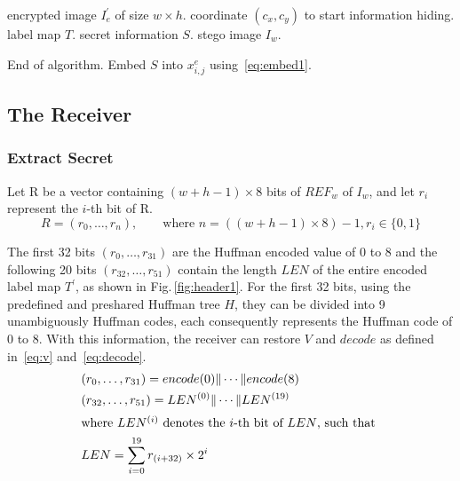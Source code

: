 \begin{algorithm}
	\caption{Embed secret information.}
	\label{algo:hider1}
	
	\begin{algorithmic}[1]
		\Require encrypted image $I_e^\prime$ of size $w \times h$.
		\Require coordinate $(c_x, c_y)$ to start information hiding.
		\Require label map $T$.
		\Require secret information $S$.
		\Ensure stego image $I_w$.
		
		\ForAll{$\{(i, j) \mid (i = c_x \wedge j \in (c_y, w)) \vee (i \in (c_x, h), j \in [1, w))\}$}
		\State			End of algorithm.
		\Else
		\State			Embed $S$ into $x^e_{i, j}$ using~\eqref{eq:embed1}.
		\EndIf
		\EndFor
	\end{algorithmic}
\end{algorithm}












\subsection{The Receiver}


\subsubsection{Extract Secret}
\label{sec:extract}

Let R be a vector containing $(w + h - 1)\times 8$ bits of $REF_w$ of $I_w$, and let $r_i$ represent the $i$-th bit of R.
\begin{equation}
	R = (r_0, \dots, r_{n}), \qquad \text{where } n = ((w + h - 1) \times 8) - 1, r_i \in \{0, 1\}
\end{equation}

The first 32 bits $(r_0   , \dots, r_{31})$ are the Huffman encoded value of 0 to 8 and 
the following 20 bits $(r_{32}, \dots, r_{51})$ contain the length $LEN$ of the entire encoded label map $T^\prime$, as shown in Fig.\,\ref{fig:header1}.
For the first 32 bits, using the predefined and preshared Huffman tree $H$, they can be divided into 9 unambiguously Huffman codes, each consequently represents the Huffman code of 0 to 8. 
With this information, the receiver can restore $V$ and $decode$ as defined in~\eqref{eq:v} and~\eqref{eq:decode}.
\begin{align}
	\label{eq:r32}
	&(r_0   , \dots, r_{31}) = encode(0) \Vert \cdots \Vert encode(8) \\
	&(r_{32}, \dots, r_{51}) = LEN^{(0)} \Vert \cdots \Vert LEN^{(19)} \\
	\intertext{where $LEN^{(i)}$ denotes the $i$-th bit of $LEN$, such that }  
	\label{eq:len}
	&LEN  = \sum_{i = 0}^{19} r_{(i + 32)} \times 2^i
\end{align}


